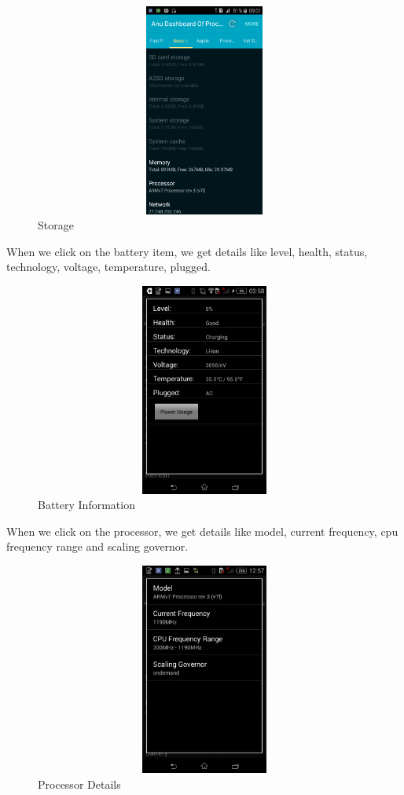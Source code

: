\documentclass[12pt]{report}
\begin{document}
\begin{figure}[H]
	\centering
	\includegraphics[width=1.0\textwidth,width=5cm,height=7cm]{storage}
	\caption{Storage}
\end{figure}
When we click on the battery item, we get details like level, health, status, technology, voltage, temperature, plugged.
\begin{figure}[H]
	\centering
	\includegraphics[width=1.0\textwidth,width=5cm,height=7cm]{battery_details}
	\caption{Battery Information}
\end{figure}
When we click on the processor, we get details like model, current frequency, cpu frequency range and scaling governor.
\begin{figure}[H]
	\centering
	\includegraphics[width=1.0\textwidth,width=5cm,height=7cm]{processor_details}
	\caption{Processor Details}
\end{figure}
\end{document}
